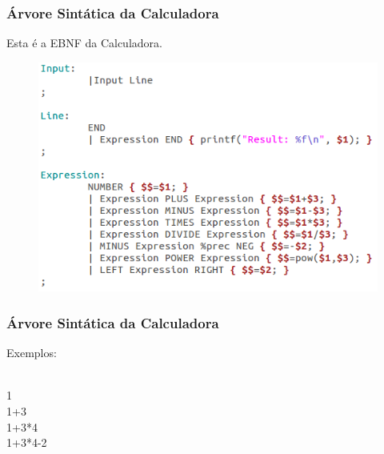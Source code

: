 \documentclass{beamer}
\begin{document}
\begin{frame}
 \frametitle{Árvore Sintática da Calculadora }
   Esta é a EBNF da Calculadora.\\
   \begin{figure} 	%
            \centering		%
            \includegraphics[scale=0.5]{EBNF.png} %
            \end{figure} 
\end{frame}


\begin{frame}
\frametitle{Árvore Sintática da Calculadora }

Exemplos:

\\ 1
\\ 1+3
\\ 1+3*4
\\ 1+3*4-2

\end{frame}
\end{document}
